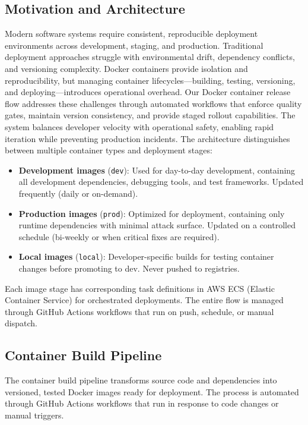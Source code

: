 \subsection{Motivation and Architecture}
Modern software systems require consistent, reproducible deployment environments
across development, staging, and production. Traditional deployment
approaches struggle with environmental drift, dependency conflicts,
and versioning complexity. Docker containers provide isolation and reproducibility,
but managing container lifecycles—building, testing, versioning, and deploying—introduces
operational overhead. Our Docker container release flow addresses
these challenges through automated workflows that enforce quality
gates, maintain version consistency, and provide staged rollout
capabilities. The system balances developer velocity with operational safety,
enabling rapid iteration while preventing production incidents. The architecture
distinguishes between multiple container types and deployment stages:
\begin{itemize}
  \item \textbf{Development images} (\texttt{dev}): Used for day-to-day
    development, containing all development dependencies, debugging
    tools, and test frameworks. Updated frequently (daily or on-demand).

  \item \textbf{Production images} (\texttt{prod}): Optimized for
    deployment, containing only runtime dependencies with minimal attack
    surface. Updated on a controlled schedule (bi-weekly or when critical
    fixes are required).

  \item \textbf{Local images} (\texttt{local}): Developer-specific
    builds for testing container changes before promoting to dev. Never
    pushed to registries.
\end{itemize}
Each image stage has corresponding task definitions in AWS ECS (Elastic
Container Service) for orchestrated deployments. The entire flow is managed
through GitHub Actions workflows that run on push, schedule, or manual
dispatch.
\subsection{Container Build Pipeline}
The container build pipeline transforms source code and dependencies
into versioned, tested Docker images ready for deployment. The process
is automated through GitHub Actions workflows that run in response to
code changes or manual triggers.
